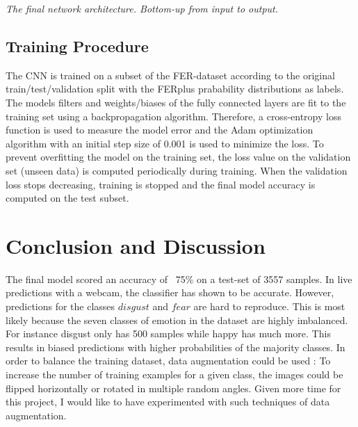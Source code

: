 \documentclass[twoside]{article}
\begin{document}
\begin{multicols}{2}
\begin{tabular}{|| c ||}
\end{tabular}

\medskip

\textit{The final network architecture. Bottom-up from input to output.}


\subsection{Training Procedure}
The CNN is trained on a subset of the FER-dataset according to the original train/test/validation split with the FERplus prabability distributions as labels. The models filters and weights/biases of the fully connected layers are fit to the training set using a backpropagation algorithm. Therefore, a cross-entropy loss function is used to measure the model error and the Adam optimization algorithm with an initial step size of 0.001 is used to minimize the loss. To prevent overfitting the model on the training set, the loss value on the validation set (unseen data) is computed periodically during training. When the validation loss stops decreasing, training is stopped and the final model accuracy is computed on the test subset.


\section{Conclusion and Discussion}

The final model scored an accuracy of ~75\% on a test-set of 3557 samples. In live predictions with a webcam, the classifier has shown to be accurate. However, predictions for the classes $disgust$ and $fear$ are hard to reproduce. This is most likely because the seven classes of emotion in the dataset are highly imbalanced. For instance disgust only has 500 samples while happy has much more. This results in biased predictions with higher probabilities of the majority classes. In order to balance the training dataset, data augmentation could be used \cite{krizhevsky12}: To increase the number of training examples for a given class, the images could be flipped horizontally or rotated in multiple random angles. Given more time for this project, I would like to have experimented with such techniques of data augmentation. 









\end{multicols}
\end{document}
